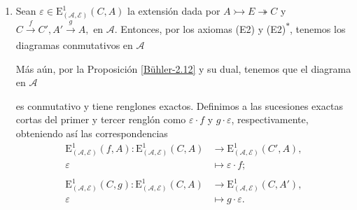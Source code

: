 \documentclass[tesis]{subfiles}
\begin{document}
\begin{Def}
\begin{enumerate}[label=(\alph*)]
        \item Sean $\varepsilon\in \text{E}_{(\mathscr{A},\mathscr{E})}^1(C,A)$ la extensión dada por $A\rightarrowtail E\twoheadrightarrow C$ y $C\xrightarrow[]{f}C', A'\xrightarrow[]{g}A,$ en $\mathscr{A}$. Entonces, por los axiomas (E2) y (E2)\textsuperscript{$\ast$}, tenemos los diagramas conmutativos en $\mathscr{A}$
            \begin{center}
            \end{center}
            Más aún, por la Proposición \ref{Bühler-2.12} y su dual, tenemos que el diagrama en $\mathscr{A}$
            \begin{center}
            \end{center}
            es conmutativo y tiene renglones exactos. Definimos a las sucesiones exactas cortas del primer y tercer renglón como $\varepsilon\cdot f$ y $g\cdot\varepsilon$, respectivamente, obteniendo así las correspondencias
            \begin{align*}
                \text{E}^1_{(\mathscr{A},\mathscr{E})}(f,A):\text{E}^1_{(\mathscr{A},\mathscr{E})}(C,A)&\to \text{E}^1_{(\mathscr{A},\mathscr{E})}(C',A), \\
                \varepsilon &\mapsto \varepsilon\cdot f; \\ \\
                \text{E}^1_{(\mathscr{A},\mathscr{E})}(C,g):\text{E}^1_{(\mathscr{A},\mathscr{E})}(C,A)&\to \text{E}^1_{(\mathscr{A},\mathscr{E})}(C,A'), \\
                \varepsilon &\mapsto g\cdot\varepsilon.
            \end{align*}


\end{enumerate}
\end{Def}
\end{document}
